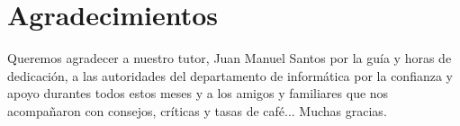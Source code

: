 
\section{Agradecimientos}
Queremos agradecer a nuestro tutor, Juan Manuel Santos por la gu\'ia y 
horas de dedicaci\'on, a las autoridades del departamento de inform\'atica 
por la confianza y apoyo durantes todos estos meses y a los amigos y familiares  
que nos  acompa\~naron con consejos, cr\'iticas y tasas de caf\'e... Muchas gracias.


\label{agradecimientos}
